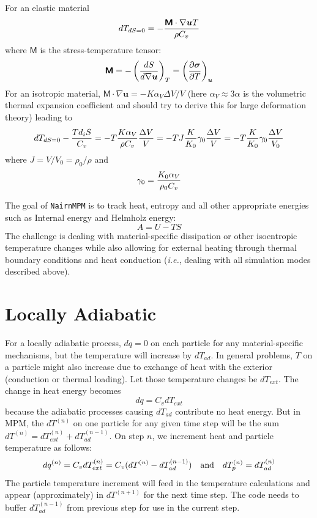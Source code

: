 \documentclass[11pt]{book}
\renewcommand{\vec}[1]{\boldsymbol{#1}}
\newcommand{\tens}[1]{\boldsymbol{\mathsf{#1}}}
\begin{document}
For an elastic material
\begin{equation}%
      dT_{dS=0}  =  - {\tens M \cdot \nabla\vec uT\over \rho C_v}
\end{equation}%
where $\tens{M}$ is the stress-temperature tensor:
\begin{equation}%
      \tens{M} = -\left({dS\over d\nabla\vec u}\right)_T = \left(\partial\tens\sigma \over \partial T\right)_{\vec u}
\end{equation}%
For an isotropic material, $\tens{M}\cdot \nabla\vec u = - K\alpha_V \Delta V/V$ (here $\alpha_V\approx3\alpha$ is the volumetric thermal expansion coefficient and should try to derive this for large deformation theory) leading to
\begin{equation}
    dT_{dS=0} - {Td_iS\over C_v} = -T {K\alpha_V\over \rho C_v}{\Delta V\over V} = -T J {K\over K_0} \gamma_0 {\Delta V\over V} = -T {K\over K_0} \gamma_0 {\Delta V\over V_0}
\end{equation}
where $J = V/V_0 = \rho_0/ \rho$ and
\begin{equation}
    \gamma_0 = {K_0\alpha_V\over \rho_0 C_v}      \label{gamzdef}
\end{equation}


The goal of {\tt NairnMPM} is to track heat, entropy and all other appropriate energies such as Internal energy and Helmholz energy:
\begin{equation}%
     A = U - TS
\end{equation}%
The challenge is dealing with material-specific dissipation or other isoentropic temperature changes while also allowing for external heating through thermal boundary conditions and heat conduction ({\em i.e.}, dealing with all simulation modes described above).

\section{Locally Adiabatic}

For a locally adiabatic process, $dq=0$ on each particle for any material-specific mechanisms, but the temperature will increase by $dT_{ad}$. In general problems, $T$ on a particle might also increase due to exchange of heat with the exterior (conduction or thermal loading). Let those temperature changes be $dT_{ext}$. The change in heat energy becomes
\begin{equation}
    dq =  C_v dT_{ext}
\end{equation}
because the adiabatic processes causing $dT_{ad}$ contribute no heat energy. But in MPM, the $dT^{(n)}$ on one particle for any given time step will be the sum $dT^{(n)} = dT_{ext}^{(n)}+dT_{ad}^{(n-1)}$. On step $n$, we increment heat and particle temperature as follows:
\begin{equation}
    dq^{(n)} =  C_v dT_{ext}^{(n)} = C_v(dT^{(n)}-dT_{ad}^{(n-1)}) \quad {\rm and}\quad dT_p^{(n)} = dT_{ad}^{(n)}
\end{equation}
The particle temperature increment will feed in the temperature calculations and appear (approximately) in $dT^{(n+1)}$ for the next time step. The code needs to buffer $dT_{ad}^{(n-1)}$ from previous step for use in the current step.
\end{document}
